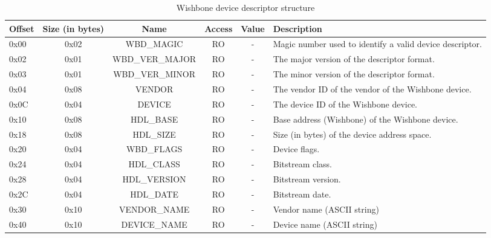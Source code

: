 \documentclass{article}
\begin{document}
\begin{center}
	\begin{savenotes}
	\begin{table}[!ht]\footnotesize
	\caption{Wishbone device descriptor structure}\label{dev_desc_struct}\centering
	\begin{tabular}{| l | c | c | c | c | p{5cm} |} \hline
	Offset & Size (in bytes) & Name & Access & Value & Description \\ \hline
	0x00 & 0x02 & WBD\_MAGIC & RO & - & Magic number used to identify a valid device descriptor. \\ \hline
	0x02 & 0x01 & WBD\_VER\_MAJOR & RO & - & The major version of the descriptor format. \\ \hline
	0x03 & 0x01 & WBD\_VER\_MINOR & RO & - & The minor version of the descriptor format. \\ \hline
	0x04 & 0x08 & VENDOR & RO & - & The vendor ID of the vendor of the Wishbone device. \\ \hline
	0x0C & 0x04 & DEVICE & RO & - & The device ID of the Wishbone device. \\ \hline
	0x10 & 0x08 & HDL\_BASE & RO & - & Base address (Wishbone) of the Wishbone device. \\ \hline
	0x18 & 0x08 & HDL\_SIZE & RO & - & Size (in bytes) of the device address space. \\ \hline
	0x20 & 0x04 & WBD\_FLAGS & RO & - & Device flags. \\ \hline
	0x24 & 0x04 & HDL\_CLASS & RO & - & Bitstream class. \\ \hline
	0x28 & 0x04 & HDL\_VERSION & RO & - & Bitstream version. \\ \hline
	0x2C & 0x04 & HDL\_DATE & RO & - & Bitstream date. \\ \hline
	0x30 & 0x10 & VENDOR\_NAME & RO & - & Vendor name (ASCII string) \\ \hline
	0x40 & 0x10 & DEVICE\_NAME & RO & - & Device name (ASCII string) \\ \hline
	\end{tabular}
	\end{table}
	\end{savenotes}
\end{center}
\end{document}
